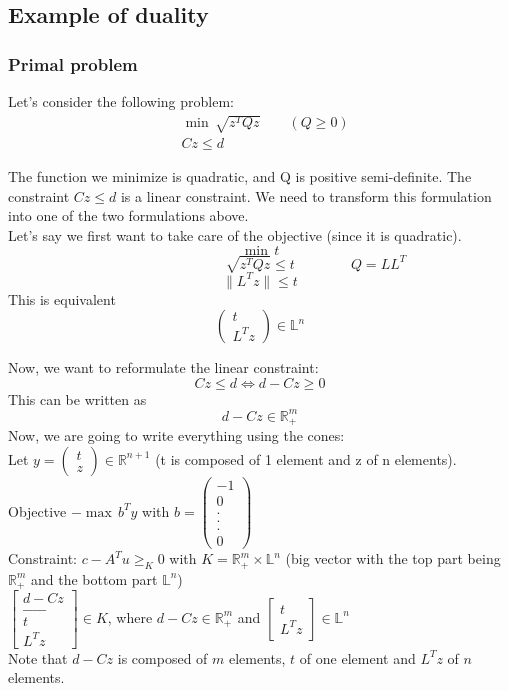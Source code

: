 \subsection{Example of duality}

\subsubsection{Primal problem}
Let's consider the following problem: 
\begin{align*}
&\min \, \sqrt{z^TQz} \qquad (Q\geq 0)\\
&Cz \leq d
\end{align*}

The function we minimize is quadratic, and Q is positive semi-definite. The constraint $Cz \leq d$ is a linear constraint. We need to transform this formulation into one of the two formulations above. \\
Let's say we first want to take care of the objective (since it is quadratic). 
$$\min \, t$$
$$\qquad \qquad \qquad \qquad \sqrt{z^TQz}\leq t \qquad \qquad Q=LL^T$$
$$\parallel L^Tz \parallel \leq t$$
This is equivalent 
$$\begin{pmatrix}
t\\
L^Tz
\end{pmatrix} \in \mathbb{L}^n$$

Now, we want to reformulate the linear constraint: 
$$Cz\leq d \Longleftrightarrow d-Cz \geq 0$$
This can be written as 
$$d-Cz \in \mathbb{R}^m_+$$
Now, we are going to write everything using the cones: \\
Let $y=\begin{pmatrix}
t\\
z
\end{pmatrix} \in \mathbb{R}^{n+1}$ (t is composed of 1 element and z of n elements). \\
Objective $-\max \, b^Ty$ with $b=\begin{pmatrix}
-1\\
0\\
. \\
. \\
. \\
0
\end{pmatrix}$\\
Constraint: $c-A^Tu \geq_K 0 $ with $K= \mathbb{R}^m_+ \times \mathbb{L}^n$ (big vector with the top part being $\mathbb{R}^m_+$ and the bottom part $\mathbb{L}^n$)\\

$\begin{bmatrix}
d-Cz\\
\_ \_ \_ \_ \_ \\
t\\
L^Tz
\end{bmatrix} \in K$, where $d-Cz \in \mathbb{R}^m_+$ and $\begin{bmatrix}
t\\
L^Tz
\end{bmatrix} \in \mathbb{L}^n$\\
Note that $d-Cz$ is composed of $m$ elements, $t$ of one element and $L^Tz$ of $n$ elements. \\

